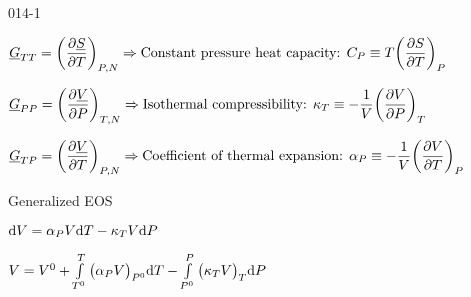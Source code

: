 \begin{mitframe}{014-1}

    
\begin{listone}
        
    \item $\uline{\gibbs}_{\Temp\Temp} = \bigg(\dfrac{\partial\uline{\entropy}}{\partial\Temp}\bigg)_{\p,\nummoles}\Rightarrow\text{Constant pressure heat capacity: }\cp\equiv\Temp\bigg(\dfrac{\partial\entropy}{\partial\Temp}\bigg)_{\p}$
        
    \item $\uline{\gibbs}_{\p\p} = \bigg(\dfrac{\partial\uline{\vol}}{\partial\p}\bigg)_{\Temp,\nummoles}\Rightarrow\text{Isothermal compressibility: }\comeback_{\Temp}\equiv-\dfrac{1}{\vol}\bigg(\dfrac{\partial\vol}{\partial\p}\bigg)_{\Temp}$
    
         
    \item $\uline{\gibbs}_{\Temp\p} = \bigg(\dfrac{\partial\uline{\vol}}{\partial\Temp}\bigg)_{\p,\nummoles}\Rightarrow\text{Coefficient of thermal expansion: }\tdiff_{\p} \equiv-\dfrac{1}{\vol}\bigg(\dfrac{\partial\vol}{\partial\Temp}\bigg)_{\p}$
    
    
    \item Generalized EOS
    
    \begin{listtwo}
		
        \item $\mathrm{d}\vol=\tdiff_{\p}\vol\mathrm{d}\Temp-\comeback_{\Temp}\vol\mathrm{d}\p$
        
        \item $\vol = \vol^{\init}+\int\limits_{\Temp^{\init}}^{\Temp}\big(\tdiff_{\p}\vol\big)_{\p^{\init}}\mathrm{d}\Temp-\int\limits_{\p^{\init}}^{\p}\big(\comeback_{\Temp}\vol\big)_{\Temp}\mathrm{d}\p$
        
	\end{listtwo}

\end{listone}			

\end{mitframe}